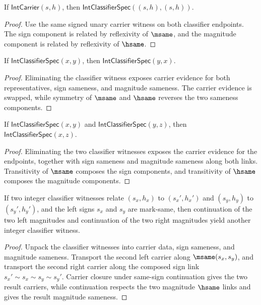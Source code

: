 \begin{theorem}
\label{thm:int-classifier-refl}
If $\mathsf{IntCarrier}(s,h)$, then
$\mathsf{IntClassifierSpec}((s,h),(s,h))$.
\end{theorem}
\begin{proof}
Use the same signed unary carrier witness on both classifier endpoints. The sign component is related by reflexivity of $\msame$, and the magnitude component is related by reflexivity of $\hsame$.
\end{proof}

\begin{theorem}
\label{thm:int-classifier-symmetry}
If \(\mathsf{IntClassifierSpec}(x,y)\), then
\(\mathsf{IntClassifierSpec}(y,x)\).
\end{theorem}
\begin{proof}
Eliminating the classifier witness exposes carrier evidence for both
representatives, sign sameness, and magnitude sameness. The carrier evidence is
swapped, while symmetry of \(\msame\) and \(\hsame\) reverses the two sameness
components.
\end{proof}

\begin{theorem}
\label{thm:int-classifier-transitivity}
If \(\mathsf{IntClassifierSpec}(x,y)\) and
\(\mathsf{IntClassifierSpec}(y,z)\), then
\(\mathsf{IntClassifierSpec}(x,z)\).
\end{theorem}
\begin{proof}
Eliminating the two classifier witnesses exposes the carrier evidence for the
endpoints, together with sign sameness and magnitude sameness along both
links. Transitivity of \(\msame\) composes the sign components, and
transitivity of \(\hsame\) composes the magnitude components.
\end{proof}

\begin{theorem}
\label{thm:int-classifier-continuation-closed-same-sign}
If two integer classifier witnesses relate \((s_x,h_x)\) to \((s_x',h_x')\)
and \((s_y,h_y)\) to \((s_y',h_y')\), and the left signs \(s_x\) and \(s_y\)
are mark-same, then continuation of the two left magnitudes and continuation
of the two right magnitudes yield another integer classifier witness.
\end{theorem}
\begin{proof}
Unpack the classifier witnesses into carrier data, sign sameness, and magnitude
sameness. Transport the second left carrier along \(\msame(s_x,s_y)\), and
transport the second right carrier along the composed sign link
\(s_x'\sim s_x\sim s_y\sim s_y'\). Carrier closure under same-sign continuation
gives the two result carriers, while continuation respects the two magnitude
\(\hsame\) links and gives the result magnitude sameness.
\end{proof}


